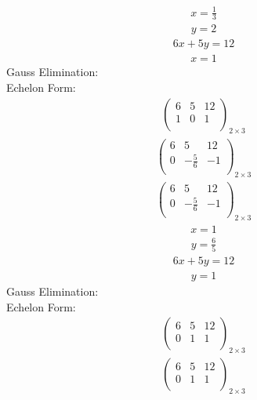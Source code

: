 \documentclass{article}
\begin{document}
\begin{align*}
x=\frac{1}{3}\end{align*}
\begin{align*}
y=2\end{align*}
\begin{align*}
6x + 5y=12\end{align*}
\begin{align*}
x=1\end{align*}
Gauss Elimination:\\
Echelon Form:\\
\begin{align*}
\left(
\begin{array}{cc|c}
6 & 5 & 12\\
1 & 0 & 1\\
\end{array}
\right)_{2\times 3}
\end{align*}
\begin{align*}
\left(
\begin{array}{cc|c}
6 & 5 & 12\\
0 & -\frac{5}{6} & -1\\
\end{array}
\right)_{2\times 3}
\end{align*}
\begin{align*}
\left(
\begin{array}{cc|c}
6 & 5 & 12\\
0 & -\frac{5}{6} & -1\\
\end{array}
\right)_{2\times 3}
\end{align*}
\begin{align*}
x=1\end{align*}
\begin{align*}
y=\frac{6}{5}\end{align*}
\begin{align*}
6x + 5y=12\end{align*}
\begin{align*}
y=1\end{align*}
Gauss Elimination:\\
Echelon Form:\\
\begin{align*}
\left(
\begin{array}{cc|c}
6 & 5 & 12\\
0 & 1 & 1\\
\end{array}
\right)_{2\times 3}
\end{align*}
\begin{align*}
\left(
\begin{array}{cc|c}
6 & 5 & 12\\
0 & 1 & 1\\
\end{array}
\right)_{2\times 3}
\end{align*}
\end{document}
